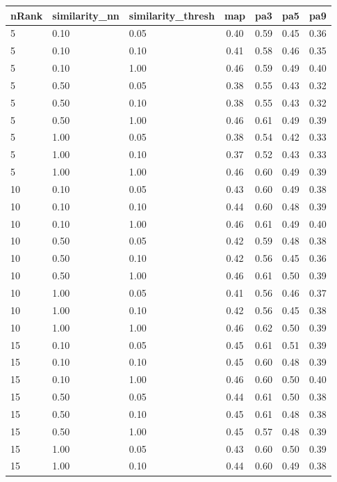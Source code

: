  
\begin{table} 
\begin{center} 
\scriptsize 
 \setlength{\tabcolsep}{.16667em} 
\begin{tabular}{lllcccc} 
nRank & similarity\_nn & similarity\_thresh & map & pa3 & pa5 & pa9 \\ 
\hline 
 5 & 0.10 & 0.05 & 0.40 & 0.59 & 0.45 & 0.36 \\ 
 5 & 0.10 & 0.10 & 0.41 & 0.58 & 0.46 & 0.35 \\ 
 5 & 0.10 & 1.00 & 0.46 & 0.59 & 0.49 & 0.40 \\ 
 5 & 0.50 & 0.05 & 0.38 & 0.55 & 0.43 & 0.32 \\ 
 5 & 0.50 & 0.10 & 0.38 & 0.55 & 0.43 & 0.32 \\ 
 5 & 0.50 & 1.00 & 0.46 & 0.61 & 0.49 & 0.39 \\ 
 5 & 1.00 & 0.05 & 0.38 & 0.54 & 0.42 & 0.33 \\ 
 5 & 1.00 & 0.10 & 0.37 & 0.52 & 0.43 & 0.33 \\ 
 5 & 1.00 & 1.00 & 0.46 & 0.60 & 0.49 & 0.39 \\ 
10 & 0.10 & 0.05 & 0.43 & 0.60 & 0.49 & 0.38 \\ 
10 & 0.10 & 0.10 & 0.44 & 0.60 & 0.48 & 0.39 \\ 
10 & 0.10 & 1.00 & 0.46 & 0.61 & 0.49 & 0.40 \\ 
10 & 0.50 & 0.05 & 0.42 & 0.59 & 0.48 & 0.38 \\ 
10 & 0.50 & 0.10 & 0.42 & 0.56 & 0.45 & 0.36 \\ 
10 & 0.50 & 1.00 & 0.46 & 0.61 & 0.50 & 0.39 \\ 
10 & 1.00 & 0.05 & 0.41 & 0.56 & 0.46 & 0.37 \\ 
10 & 1.00 & 0.10 & 0.42 & 0.56 & 0.45 & 0.38 \\ 
10 & 1.00 & 1.00 & 0.46 & 0.62 & 0.50 & 0.39 \\ 
15 & 0.10 & 0.05 & 0.45 & 0.61 & 0.51 & 0.39 \\ 
15 & 0.10 & 0.10 & 0.45 & 0.60 & 0.48 & 0.39 \\ 
15 & 0.10 & 1.00 & 0.46 & 0.60 & 0.50 & 0.40 \\ 
15 & 0.50 & 0.05 & 0.44 & 0.61 & 0.50 & 0.38 \\ 
15 & 0.50 & 0.10 & 0.45 & 0.61 & 0.48 & 0.38 \\ 
15 & 0.50 & 1.00 & 0.45 & 0.57 & 0.48 & 0.39 \\ 
15 & 1.00 & 0.05 & 0.43 & 0.60 & 0.50 & 0.39 \\ 
15 & 1.00 & 0.10 & 0.44 & 0.60 & 0.49 & 0.38 \\ 

\end{tabular}
\end{center}
\end{table}
